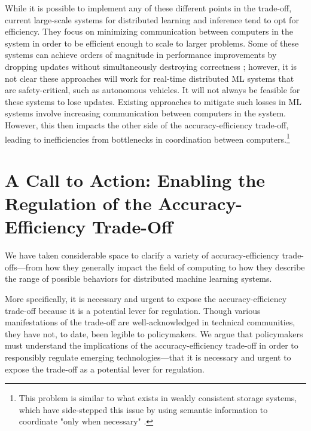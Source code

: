 \documentclass[sigplan,screen]{acmart}
\begin{document}
While it is possible to implement any of these different points in the trade-off, current large-scale systems for distributed learning and inference tend to opt for efficiency. They focus on minimizing communication between computers in the system in order to be efficient enough to scale to larger problems. Some of these systems can achieve orders of magnitude in performance improvements by dropping updates without simultaneously destroying correctness \cite{Niu2011hogwild, tsitsiklis1986stochastic}; however, it is not clear these approaches will work for real-time distributed ML systems that are safety-critical, such as autonomous vehicles. It will not always be feasible for these systems to lose updates. Existing approaches to mitigate such losses in ML systems involve increasing communication between computers in the system. However, this then impacts the other side of the accuracy-efficiency trade-off, leading to inefficiencies from bottlenecks in coordination between computers.\footnote{This problem is similar to what exists in weakly consistent storage systems, which have side-stepped this issue by using semantic information to coordinate "only when necessary" \cite{Badrinath1992beyondcommutativity, DiPippo1997semanticcc, Herman2016typeaware, molina1983semantic, weihl1988commutativity}.}

\section{A Call to Action: Enabling the Regulation of the Accuracy-Efficiency Trade-Off} \label{sec:policy}
We have taken considerable space to clarify a variety of accuracy-efficiency trade-offs---from how they generally impact the field of computing to how they describe the range of possible behaviors for distributed machine learning systems.

More specifically, it is necessary and urgent to expose the accuracy-efficiency trade-off because it is a potential lever for regulation. Though various manifestations of the trade-off are well-acknowledged in technical communities, they have not, to date, been legible to policymakers. We argue that policymakers must understand the implications of the accuracy-efficiency trade-off in order to responsibly regulate emerging technologies---that it is necessary and urgent to expose the trade-off as a potential lever for regulation. 
\end{document}
